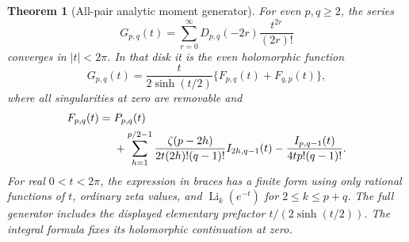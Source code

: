 \documentclass[11pt,a4paper]{article}
\numberwithin{equation}{section}
\newtheorem{theorem}{Theorem}[section]
\theoremstyle{definition}
\theoremstyle{remark}
\begin{document}
\begin{theorem}[All-pair analytic moment generator]
\label{tail:generator}
For even \(p,q\ge2\), the series
\[
 G_{p,q}(t)=\sum_{r=0}^{\infty}
           D_{p,q}(-2r)\frac{t^{2r}}{(2r)!}
\]
converges in \(|t|<2\pi\). In that disk it is the even holomorphic
function
\begin{equation}\label{tail:generator-formula}
 \boxed{
 G_{p,q}(t)=\frac{t}{2\sinh(t/2)}
             \{F_{p,q}(t)+F_{q,p}(t)\},}
\end{equation}
where all singularities at zero are removable and
\begin{align}\label{tail:F}
 F_{p,q}(t)={}&P_{p,q}(t)\notag\\
 &+\sum_{h=1}^{p/2-1}
   \frac{\zeta(p-2h)}{2t(2h)!(q-1)!}
       I_{2h,q-1}(t)
  -\frac{I_{p,q-1}(t)}{4t p!(q-1)!}.
\end{align}
For real \(0<t<2\pi\), the expression in braces has a finite
form using only rational functions of \(t\), ordinary zeta values,
and \(\operatorname{Li}_k(e^{-t})\) for \(2\le k\le p+q\).
The full generator includes the displayed elementary prefactor
\(t/(2\sinh(t/2))\).
The integral formula fixes its holomorphic continuation at zero.
\end{theorem}
\end{document}

